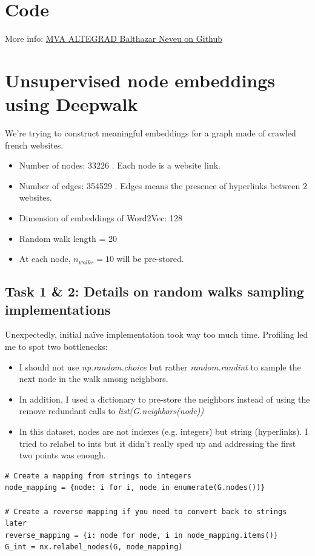 \documentclass[a4paper]{article}
\begin{document}

\section*{Code}

More info:
\href{https://github.com/balthazarneveu/MVA23_ALTEGRAD/#readme}{MVA ALTEGRAD Balthazar Neveu on Github}

\section{Unsupervised node embeddings using Deepwalk}

We're trying to construct meaningful embeddings for a graph made of crawled french websites.

\begin{itemize}
    \item Number of nodes: 33226 . Each node is a website link.
    \item Number of edges: 354529 . Edges means the presence of hyperlinks between 2 websites.
    \item Dimension of embeddings of Word2Vec: 128
    \item Random walk length = 20
    \item At each node, $n_{walks}=10$ will be pre-stored.
\end{itemize}

\subsection*{Task 1 \& 2: Details on random walks sampling implementations}
Unexpectedly, initial naïve implementation took way too much time. 
Profiling led me to spot two bottlenecks:
\begin{itemize}
    \item I should not use \textit{np.random.choice} but rather \textit{random.randint} 
    to sample the next node in the walk
among neighbors.
    \item In addition, I used a dictionary to pre-store the neighbors instead of using the remove redundant calls to \textit{list(G.neighbors(node))}
    \item In this dataset, nodes are not indexes (e.g. integers) but string (hyperlinks).
    I tried to relabel to ints but it didn't really sped up and addressing the first two points was enough.
\end{itemize}

\begin{verbatim}
# Create a mapping from strings to integers
node_mapping = {node: i for i, node in enumerate(G.nodes())}

# Create a reverse mapping if you need to convert back to strings later
reverse_mapping = {i: node for node, i in node_mapping.items()}
G_int = nx.relabel_nodes(G, node_mapping)
\end{verbatim}
\end{document}

